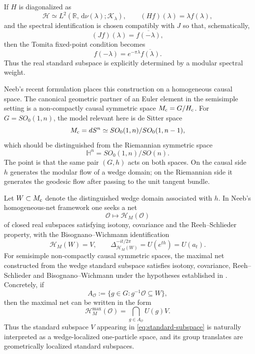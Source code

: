 \documentclass[a4paper,11pt]{article}
\theoremstyle{definition}
\newcommand{\dd}{\,\mathrm{d}}
\newcommand{\cH}{\mathcal{H}}
\begin{document}
If \(H\) is diagonalized as
\[
\cH\simeq L^2(\mathbb R,\dd\nu(\lambda);\mathcal K_\lambda),
\qquad
(Hf)(\lambda)=\lambda f(\lambda),
\]
and the spectral identification is chosen compatibly with \(J\) so that, schematically,
\[
(Jf)(\lambda)=\overline{f(-\lambda)},
\]
then the Tomita fixed-point condition becomes
\begin{equation}
f(-\lambda)=e^{-\pi\lambda}\overline{f(\lambda)}.
\label{eq:spectral-standard}
\end{equation}
Thus the real standard subspace is explicitly determined by a modular spectral weight.

Neeb's recent formulation places this construction on a homogeneous causal space.  The
canonical geometric partner of an Euler element in the semisimple setting is a
non-compactly causal symmetric space \(M_{\rm c}=G/H_{\rm c}\).  For
\(G=SO_0(1,n)\), the model relevant here is de Sitter space
\begin{equation}
M_{\rm c}=dS^n
\simeq
SO_0(1,n)/SO_0(1,n-1),
\label{eq:de-sitter}
\end{equation}
which should be distinguished from the Riemannian symmetric space
\[
\mathbb H^n=SO_0(1,n)/SO(n).
\]
The point is that the same pair \((G,h)\) acts on both spaces.  On the causal side \(h\)
generates the modular flow of a wedge domain; on the Riemannian side it generates the
geodesic flow after passing to the unit tangent bundle.

Let \(W\subset M_{\rm c}\) denote the distinguished wedge domain associated with \(h\).
In Neeb's homogeneous-net framework one seeks a net
\[
\mathcal O\longmapsto \cH_M(\mathcal O)
\]
of closed real subspaces satisfying isotony, covariance and the Reeh--Schlieder
property, with the Bisognano--Wichmann identification
\begin{equation}
\cH_M(W)=V,\qquad
\Delta_{\cH_M(W)}^{-it/2\pi}=U(e^{th})=U(a_t).
\label{eq:BW}
\end{equation}
For semisimple non-compactly causal symmetric spaces, the maximal net constructed from
the wedge standard subspace satisfies isotony, covariance, Reeh--Schlieder and
Bisognano--Wichmann under the hypotheses established in
\cite{Neeb2025,FNO2025}.  Concretely, if
\[
A_{\mathcal O}:=
\{g\in G:g^{-1}\mathcal O\subseteq W\},
\]
then the maximal net can be written in the form
\begin{equation}
\cH_M^{\max}(\mathcal O)
=
\bigcap_{g\in A_{\mathcal O}}U(g)V.
\label{eq:maximal-net}
\end{equation}
Thus the standard subspace \(V\) appearing in \eqref{eq:standard-subspace} is naturally
interpreted as a wedge-localized one-particle space, and its group translates are
geometrically localized standard subspaces.
\end{document}
